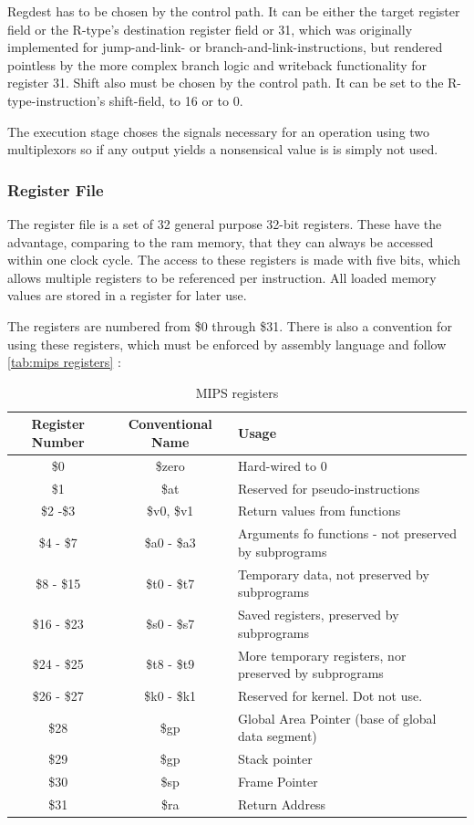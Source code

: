 Regdest has to be chosen by the control path. It can be either the target 
register field or the R-type's destination register field or 31, which was originally implemented for jump-and-link- or branch-and-link-instructions, but rendered pointless
by the more complex branch logic and writeback functionality for register 31. Shift also must be chosen by the control path. It can be set to the R-type-instruction's shift-field, 
to 16 or to 0. 

The execution stage choses the signals necessary for an operation using two multiplexors so if any output yields a nonsensical value is is simply not used.

\subsubsection{Register File}
The register file is a set of 32 general purpose 32-bit registers. These have the advantage, comparing to the ram memory, that they can always be accessed within one clock cycle.
The access to these registers is made with five bits, which allows multiple registers to be referenced per instruction. All loaded memory values are stored in a register
for later use.

The registers are numbered from \$0 through \$31. There is also a convention for using these registers, which must be enforced by assembly language and follow \autoref{tab:mips registers} 
\cite{regfiles}:

\begin{table}[h!]
	\centering
	 \caption{MIPS registers}	
	\begin{tabular}{ccl}
		\toprule[2pt]
		\textbf{Register Number} & \textbf{Conventional Name} &\textbf{Usage}  \\
		\toprule[2pt]
		\$0 & \$zero & Hard-wired to 0 \\
		\$1 & \$at & Reserved for pseudo-instructions \\
		\$2 -\$3 & \$v0, \$v1 & Return values from functions \\
		\$4 - \$7 & \$a0 - \$a3 & Arguments fo functions - not preserved by subprograms \\
		\$8 - \$15 & \$t0 - \$t7 & Temporary data, not preserved by subprograms \\
		\$16 - \$23 & \$s0 - \$s7 & Saved registers, preserved by subprograms \\
		\$24 - \$25 & \$t8 - \$t9 & More temporary registers, nor preserved by subprograms  \\
		\$26 - \$27 & \$k0 - \$k1  & Reserved for kernel. Dot not use. \\
		\$28 & \$gp & Global Area Pointer (base of global data segment) \\
		\$29 & \$gp & Stack pointer \\
		\$30 & \$sp & Frame Pointer \\
		\$31 & \$ra & Return Address \\
		\bottomrule[2pt]
	\end{tabular} 
	\label{tab:mips registers}
\end{table}

